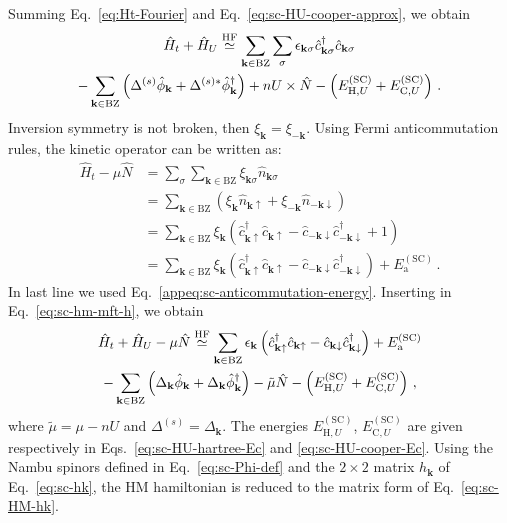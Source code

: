 \begin{tabproof}
	
	Summing Eq.~\eqref{eq:Ht-Fourier} and Eq.~\eqref{eq:sc-HU-cooper-approx}, we obtain
	\begin{multline}
		\hat H_t + \hat H_U \stackrel{\mathrm{HF}}{\simeq} \sum_{\mathbf{k} \in \mathrm{BZ}} \sum_\sigma \epsilon_{\mathbf{k}\sigma}
		\hat c_{\mathbf{k}\sigma}^\dagger \hat c_{\mathbf{k}\sigma} \\
		- \sum_{\mathbf{k}\in\mathrm{BZ}} \left(
		\Delta^{(s)} \hat \phi_\mathbf{k} + 
		\Delta^{(s)*} \hat \phi_\mathbf{k}^\dagger
		\right) + nU \times \hat N - \left(
		E_{\mathrm{H},U}^{(\mathrm{SC})} + E_{\mathrm{C},U}^{(\mathrm{SC})}
		\right) \, .
		\label{eq:sc-hm-mft-h} 
	\end{multline}
	Inversion symmetry is not broken, then $\xi_\mathbf{k} = \xi_{-\mathbf{k}}$. Using Fermi anticommutation rules, the kinetic operator can be written as:
	\[
	\begin{aligned}
		\hat H_t - \mu\hat N &= \sum_\sigma \sum_{\mathbf{k} \in \mathrm{BZ}} \xi_{\mathbf{k}\sigma} \hat n_{\mathbf{k}\sigma} \\
		&= \sum_{\mathbf{k} \in \mathrm{BZ}} \left(
		\xi_\mathbf{k} \hat n_{\mathbf{k}\uparrow} + \xi_{-\mathbf{k}} \hat n_{-\mathbf{k}\downarrow} 
		\right) \\
		&= \sum_{\mathbf{k} \in \mathrm{BZ}} \xi_\mathbf{k} \left(
		\hat c_{\mathbf{k}\uparrow}^\dagger \hat c_{\mathbf{k}\uparrow} - \hat c_{-\mathbf{k}\downarrow} \hat c_{-\mathbf{k}\downarrow}^\dagger + 1
		\right) \\
		&= \sum_{\mathbf{k} \in \mathrm{BZ}} \xi_\mathbf{k} \left(
		\hat c_{\mathbf{k}\uparrow}^\dagger \hat c_{\mathbf{k}\uparrow} - \hat c_{-\mathbf{k}\downarrow} \hat c_{-\mathbf{k}\downarrow}^\dagger
		\right) + E_\mathrm{a}^{(\mathrm{SC})} \, .
	\end{aligned}
	\]
	In last line we used Eq.~\eqref{appeq:sc-anticommutation-energy}. Inserting in Eq.~\eqref{eq:sc-hm-mft-h}, we obtain
	\begin{multline}
		\hat H_t + \hat H_U - \mu \hat N \stackrel{\mathrm{HF}}{\simeq} \sum_{\mathbf{k} \in \mathrm{BZ}} \epsilon_\mathbf{k}
		\left(
		\hat c_{\mathbf{k}\uparrow}^\dagger \hat c_{\mathbf{k}\uparrow}
		- \hat c_{\mathbf{k}\downarrow} \hat c_{\mathbf{k}\downarrow}^\dagger
		\right) + E_\mathrm{a}^{(\mathrm{SC})} \\
		- \sum_{\mathbf{k}\in\mathrm{BZ}} \left(
		\Delta_\mathbf{k} \hat \phi_\mathbf{k} + 
		\Delta_\mathbf{k} \hat \phi_\mathbf{k}^\dagger
		\right) - \tilde{\mu} \hat N - \left(
		E_{\mathrm{H},U}^{(\mathrm{SC})} + E_{\mathrm{C},U}^{(\mathrm{SC})}
		\right) \, , \label{eq:sc-HU-approx}
	\end{multline}
	where $\tilde{\mu} = \mu - nU$ and $\Delta^{(s)} = \Delta_\mathbf{k}$. The energies $E_{\mathrm{H},U}^{(\mathrm{SC})}$, $E_{\mathrm{C},U}^{(\mathrm{SC})}$ are given respectively in Eqs.~\eqref{eq:sc-HU-hartree-Ec} and \eqref{eq:sc-HU-cooper-Ec}. Using the Nambu spinors defined in Eq.~\eqref{eq:sc-Phi-def} and the $2 \times 2$ matrix $h_\mathbf{k}$ of Eq.~\eqref{eq:sc-hk}, the HM hamiltonian is reduced to the matrix form of Eq.~\eqref{eq:sc-HM-hk}.
\end{tabproof}

